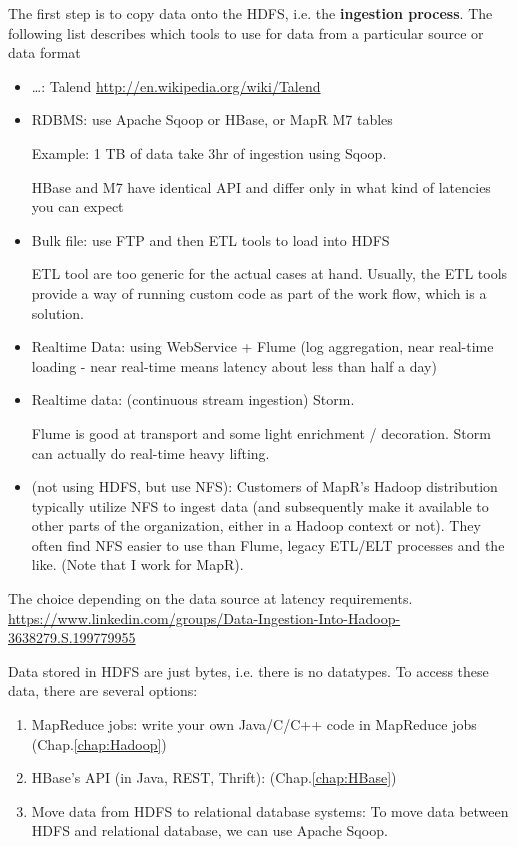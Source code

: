 The first step is to copy data onto the HDFS, i.e. the {\bf ingestion process}.
The following list describes which tools to use for data from a particular
source or data format
\begin{itemize}
  \item \ldots : Talend
  \url{http://en.wikipedia.org/wiki/Talend}
  
  
  \item RDBMS: use Apache Sqoop or HBase, or MapR M7 tables
  
  Example: 1 TB of data take 3hr of ingestion using Sqoop.
  
  HBase and M7 have identical API and differ only in what kind of latencies you
  can expect
  
  \item Bulk file: use FTP and then ETL tools to load into HDFS
  
  ETL tool are too generic for the actual cases at hand. Usually, the ETL tools
  provide a way of running custom code as part of the work flow, which is a
  solution. 
  
  \item Realtime Data: using WebService + Flume (log aggregation, near
  real-time loading - near real-time means latency about less than half a day)
  \item Realtime data: (continuous stream ingestion) Storm.
  
   Flume is good at transport and some light enrichment / decoration. Storm can
  actually do real-time heavy lifting.
  
  \item (not using HDFS, but use NFS): Customers of MapR's Hadoop distribution
  typically utilize NFS to ingest data (and subsequently make it available to
  other parts of the organization, either in a Hadoop context or not). They
  often find NFS easier to use than Flume, legacy ETL/ELT processes and the
  like. (Note that I work for MapR).
\end{itemize}
The choice depending on the data source at latency requirements.
\url{https://www.linkedin.com/groups/Data-Ingestion-Into-Hadoop-3638279.S.199779955}

Data stored in HDFS are just bytes, i.e. there is no datatypes. 
To access these data, there are several options:
\begin{enumerate}
  \item MapReduce jobs: write your own Java/C/C++ code in MapReduce jobs
  (Chap.\ref{chap:Hadoop})
  
  \item HBase's API (in Java, REST, Thrift): (Chap.\ref{chap:HBase})
  \item Move data from HDFS to relational database systems: To move data between
  HDFS and relational database, we can use Apache Sqoop.
\end{enumerate}
 


